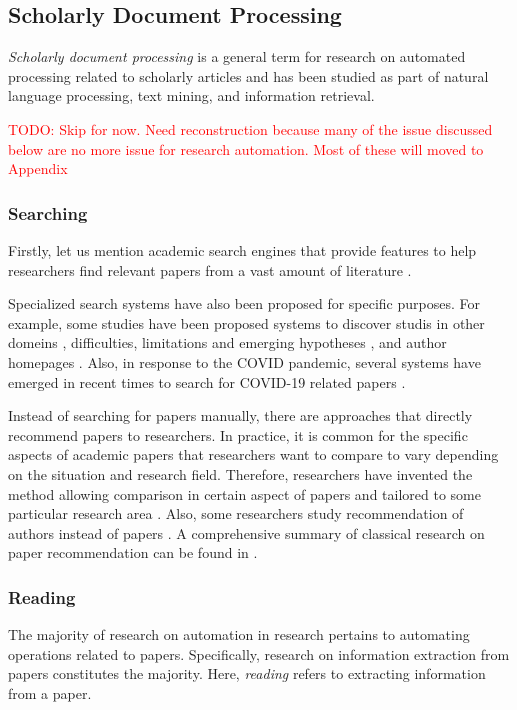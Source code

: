 \subsection{Scholarly Document Processing}
\textit{Scholarly document processing} is a general term for research on automated processing related to scholarly articles and has been studied as part of natural language processing, text mining, and information retrieval.

\textcolor{red}{TODO: Skip for now. Need reconstruction because many of the issue discussed below are no more issue for research automation. Most of these will moved to Appendix}

\subsubsection{Searching}

Firstly, let us mention academic search engines that provide features to help researchers find relevant papers from a vast amount of literature \cite{googlescholar,semanticscholar,dblp,pubmed,citeseerx}. 

Specialized search systems have also been proposed for specific purposes. For example, some studies have been proposed systems to discover studis in other domeins \cite{kang2022augmenting}, difficulties, limitations and emerging hypotheses \cite{lahav2022search}, and author homepages \cite{patel2021author}. Also, in response to the COVID pandemic, several systems have emerged in recent times to search for COVID-19 related papers \cite{hope2020scisight}.

Instead of searching for papers manually, there are approaches that directly recommend papers to researchers. In practice, it is common for the specific aspects of academic papers that researchers want to compare to vary depending on the situation and research field. Therefore, researchers have invented the method allowing comparison in certain aspect of papers \cite{ostendorff2020aspect} and tailored to some particular research area \cite{breitinger2022recommending}. Also, some researchers study recommendation of authors instead of papers \cite{portenoy2022bursting}. A comprehensive summary of classical research on paper recommendation can be found in \cite{bai2019scientific}.

\subsubsection{Reading}
The majority of research on automation in research pertains to automating operations related to papers. Specifically, research on information extraction from papers constitutes the majority. Here, \textit{reading} refers to extracting information from a paper.

